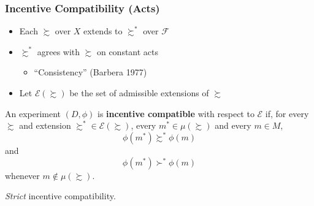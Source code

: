 %
%
%
%



\begin{frame}
  \frametitle{Incentive Compatibility (Acts)}

\begin{itemize}
    \item Each $\succsim$ over $X$ extends to $\succsim^*$ over $\mathcal{F}$
    \item $\succsim^*$ agrees with $\succsim$ on constant acts
    \begin{itemize}
        \item ``Consistency'' (Barbera 1977)
    \end{itemize}
    \item Let $\mathcal{E}(\succsim)$ be the set of admissible extensions of $\succsim$
\end{itemize}

\bigskip

\begin{definition}
    An experiment $(D,\phi)$ is \textbf{incentive compatible} with respect to $\mathcal{E}$ if, for every $\succsim$ and extension $\succsim^*\in \mathcal{E}(\succsim)$, every $m^*\in \mu(\succsim)$ and every $m\in M$,
    $$
        \phi(m^*)\succsim^* \phi(m)
    $$
   and
    $$
        \phi(m^*)\succ^* \phi(m)
    $$
    whenever $m\not\in \mu(\succsim)$.
\end{definition}

\emph{Strict} incentive compatibility.

%

\end{frame}

